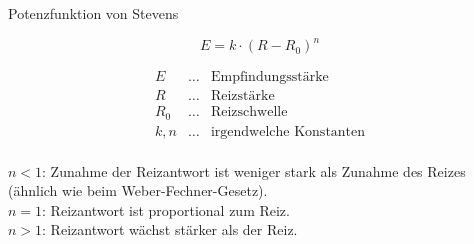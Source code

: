 \documentclass{beamer}
\begin{document}
\begin{frame}{Potenzfunktion von Stevens}

\[
E=k\cdot \left(R-R_{0}\right)^{n}
\]

\[
\begin{array}{lll}
E           &\ldots    & \text{Empfindungsstärke} \\
R           &\ldots    & \text{Reizstärke} \\
R_0           & \ldots    & \text{Reizschwelle} \\
k, n           & \ldots    & \text{irgendwelche Konstanten} \\
\end{array}
\]



\(n<1\): Zunahme der Reizantwort ist weniger stark als Zunahme des Reizes (ähnlich wie beim Weber-Fechner-Gesetz).  \\[0.2cm]



\(n=1\): Reizantwort ist proportional zum Reiz. \\[0.2 cm]

\(n>1\): Reizantwort wächst stärker als der Reiz. 



\end{frame}
\end{document}
